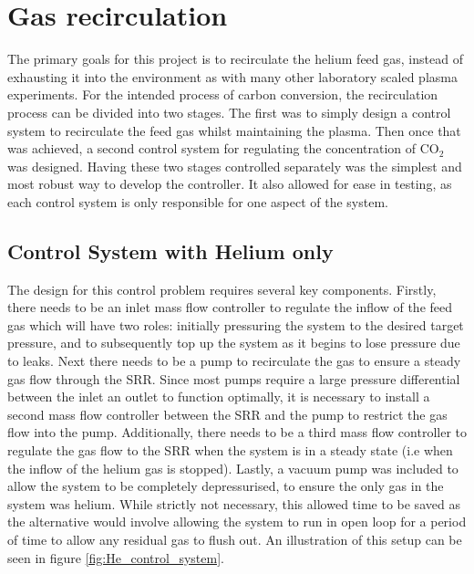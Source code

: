 \chapter{Gas recirculation}

The primary goals for this project is to recirculate the helium feed gas, instead of exhausting it into the environment as with many other laboratory scaled plasma experiments. For the intended process of carbon conversion, the recirculation process can be divided into two stages. The first was to simply design a control system to recirculate the feed gas whilst maintaining the plasma. Then once that was achieved, a second control system for regulating the concentration of CO$_2$ was designed. Having these two stages controlled separately was the simplest and most robust way to develop the controller. It also allowed for ease in testing, as each control system is only responsible for one aspect of the system.

\section{Control System with Helium only}

The design for this control problem requires several key components. Firstly, there needs to be an inlet mass flow controller to regulate the inflow of the feed gas which will have two roles: initially pressuring the system to the desired target pressure, and to subsequently top up the system as it begins to lose pressure due to leaks. Next there needs to be a pump to recirculate the gas to ensure a steady gas flow through the SRR. Since most pumps require a large pressure differential between the inlet an outlet to function optimally, it is necessary to install a second mass flow controller between the SRR and the pump to restrict the gas flow into the pump. Additionally, there needs to be a third mass flow controller to regulate the gas flow to the SRR when the system is in a steady state (i.e when the inflow of the helium gas is stopped). Lastly, a vacuum pump was included to allow the system to be completely depressurised, to ensure the only gas in the system was helium. While strictly not necessary, this allowed time to be saved as the alternative would involve allowing the system to run in open loop for a period of time to allow any residual gas to flush out. An illustration of this setup can be seen in figure \ref{fig:He_control_system}. 

